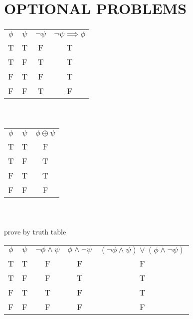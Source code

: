 \documentclass{article}
\begin{document}
\part{OPTIONAL PROBLEMS}

\section{}
\begin{tabular}{ c c c c }
  $\phi$ & $\psi$ & $\neg \psi$ & $\neg \psi \implies \phi$ \\
  T      & T      & F           & T                         \\
  T      & F      & T           & T                         \\
  F      & T      & F           & T                         \\
  F      & F      & T           & F                         \\
\end{tabular} \\

\section{}
\begin{tabular}{ c c c }
  $\phi$ & $\psi$ & $\phi \oplus \psi$ \\
  T      & T      & F                  \\
  T      & F      & T                  \\
  F      & T      & T                  \\
  F      & F      & F                  \\
\end{tabular} \\

\section{}
prove by truth table \\
\begin{tabular}{ c c c c c}
  $\phi$ & $\psi$ & $\neg \phi \wedge \psi$ & $\phi \wedge \neg \psi$ & $(\neg \phi \wedge \psi) \vee (\phi \wedge \neg \psi)$ \\
  T      & T      & F                       & F                       & F                                                      \\
  T      & F      & F                       & T                       & T                                                      \\
  F      & T      & T                       & F                       & T                                                      \\
  F      & F      & F                       & F                       & F                                                      \\
\end{tabular} \\
\end{document}

